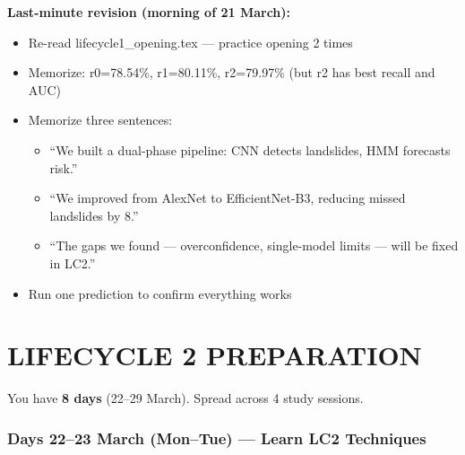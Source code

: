 \documentclass[12pt,a4paper]{article}
\begin{document}
\vspace{0.3cm}
\noindent\textbf{Last-minute revision (morning of 21 March):}
\begin{itemize}
    \item Re-read lifecycle1\_opening.tex --- practice opening 2 times
    \item Memorize: r0=78.54\%, r1=80.11\%, r2=79.97\% (but r2 has best recall and AUC)
    \item Memorize three sentences:
    \begin{itemize}
        \item ``We built a dual-phase pipeline: CNN detects landslides, HMM forecasts risk.''
        \item ``We improved from AlexNet to EfficientNet-B3, reducing missed landslides by 8.''
        \item ``The gaps we found --- overconfidence, single-model limits --- will be fixed in LC2.''
    \end{itemize}
    \item Run one prediction to confirm everything works
\end{itemize}

\part*{LIFECYCLE 2 PREPARATION}

\noindent{}

\vspace{0.3cm}
\noindent You have \textbf{8 days} (22--29 March). Spread across 4 study sessions.

\section{Days 22--23 March (Mon--Tue) --- Learn LC2 Techniques}
\end{document}
